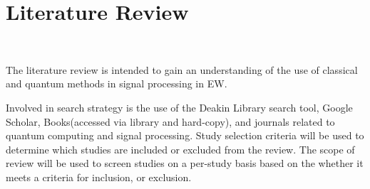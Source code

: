 \section{Literature Review}~\label{sec:literature}

The literature review is intended to gain an understanding of the use of classical and quantum methods in signal processing in \ac{EW}.

Involved in search strategy is the use of the Deakin Library search tool, Google Scholar, Books(accessed via library and hard-copy), and journals related to quantum computing and signal processing. 
Study selection criteria will be used to determine which studies are included or excluded from the review.
The scope of review will be used to screen studies on a per-study basis based on the whether it meets a criteria for inclusion, or exclusion.


